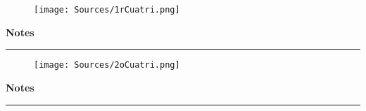 
\begin{figure}[H]
    \texttt{[image: Sources/1rCuatri.png]}
\end{figure}


\newpage
\begin{notesbox}
\textbf{Notes} \\
\rule{\linewidth}{0.02cm}
\end{notesbox}


\newpage
\begin{figure}[H]
    \texttt{[image: Sources/2oCuatri.png]}
\end{figure}


\newpage
\begin{notesbox}
\textbf{Notes} \\
\rule{\linewidth}{0.02cm}
\end{notesbox}